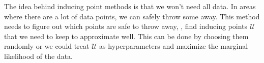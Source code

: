 The idea behind inducing point methods is that we won't need all data. In areas
where there are a lot of data points, we can safely throw some away. This
method needs to figure out which points are safe to throw away, \ie, find
inducing points $\mathcal{U}$ that we need to keep to approximate well. This
can be done by choosing them randomly or we could treat $\mathcal{U}$ as
hyperparameters and maximize the marginal likelihood of the data.
